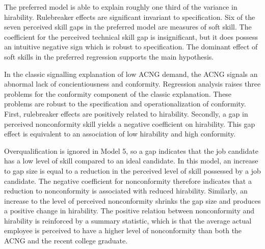 \documentclass[review]{elsarticle}
\begin{document}
The preferred model is able to explain roughly one third of the variance in hirability.
Rulebreaker effects are significant invariant to specification.
Six of the seven perceived skill gaps in the preferred model are measures of soft skill.
The coefficient for the perceived technical skill gap is insignificant, but it does possess an intuitive negative sign which is robust to specification.
The dominant effect of soft skills in the preferred regression supports the main hypothesis.

In the classic signalling explanation of low ACNG demand, the ACNG signals an abnormal lack of concientiousness and conformity.
Regression analysis raises three problems for the conformity component of the classic explanation.
These problems are robust to the specification and operationalization of conformity.
First, rulebreaker effects are positively related to hirability.
Secondly, a gap in perceived nonconformity skill yields a negative coefficient on hirability.
This gap effect is equivalent to an association of low hirability and high conformity.

Overqualification is ignored in Model 5, so a gap indicates that the job candidate has a low level of skill compared to an ideal candidate.
In this model, an increase to gap size is equal to a reduction in the perceived level of skill possessed by a job candidate.
The negative coefficient for nonconformity therefore indicates that a reduction to nonconformity is associated with reduced hirability.
Similarly, an increase to the level of perceived nonconformity shrinks the gap size and produces a positive change in hirability.
The positive relation between nonconformity and hirability is reinforced by a summary statistic,
which is that the average actual employee is perceived to have a higher level of nonconformity than both the ACNG and the recent college graduate.
\end{document}
